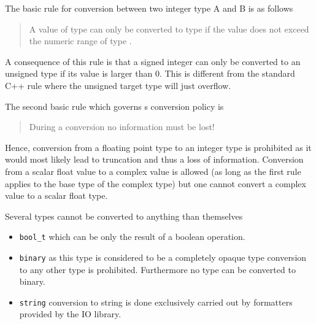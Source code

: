 The basic rule for conversion between two integer type A and B is as follows
\begin{quote}
    A value of type  can only be converted to type  if the value
    does not exceed the numeric range of type .
\end{quote}
A consequence of this rule is that a signed integer can only be converted 
to an unsigned type if its value is larger than $0$. This is different 
from the standard C++ rule where the unsigned target type will just overflow. 

The second basic rule which governs \libpnicore s conversion policy is 
\begin{quote}
    During a conversion no information must be lost!
\end{quote}
Hence, conversion from a floating point type to an integer type is prohibited as
it would most likely lead to truncation and thus a loss of information. 
Conversion from a scalar float value to a complex value is allowed (as long as
the first rule applies to the base type of the complex type) but one cannot
convert a complex value to a scalar float type.

Several types cannot be converted to anything than themselves 
\begin{itemize}
    \item \texttt{bool\_t} which can be only the result of a boolean 
        operation.
    \item \texttt{binary} as this type is considered to be a completely 
        opaque type conversion to any other type is prohibited. Furthermore no
        type can be converted to binary. 
    \item \texttt{string} conversion to string is done exclusively carried out by 
        formatters provided by the IO library. 
\end{itemize}

